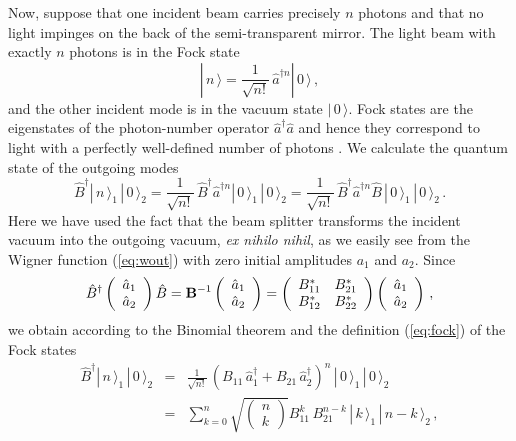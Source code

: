 \documentclass[12pt,amsmath,amssymb]{article}
\def\underline#1{{\bf #1}}
\numberwithin{equation}{section}
\begin{document}
Now, suppose that one incident beam carries precisely $n$ photons
and that no light impinges on the back of the semi-transparent
mirror. The light beam with exactly $n$ photons is in the Fock
state \cite{Leonhardt}
\begin{equation}
\label{eq:fock} |\,n\,\rangle =
\frac{1}{\sqrt{n!}}\,\hat{a}^{\dagger n} |\,0\,\rangle \,,
\end{equation}
and the other incident mode is in the vacuum state
$|\,0\,\rangle$. Fock states are the eigenstates of the
photon-number operator $\hat{a}^\dagger\hat{a}$ and hence they
correspond to light with a perfectly well-defined number of
photons \cite{Leonhardt}. We calculate the quantum state of the
outgoing modes
\begin{equation}
\hat{B}^\dagger |\,n\,\rangle_1\, |\,0\,\rangle_2 =
\frac{1}{\sqrt{n!}}\,\hat{B}^\dagger\hat{a}^{\dagger n}
|\,0\,\rangle_1\, |\,0\,\rangle_2 =
\frac{1}{\sqrt{n!}}\,\hat{B}^\dagger\hat{a}^{\dagger n}\hat{B}\,
|\,0\,\rangle_1\, |\,0\,\rangle_2 \,.
\end{equation}
Here we have used the fact that the beam splitter transforms the
incident vacuum into the outgoing vacuum, {\it ex nihilo nihil},
as we easily see from the Wigner function (\ref{eq:wout}) with
zero initial amplitudes $a_1$ and $a_2$. Since
\begin{equation}
\hat{B}^\dagger \left(
    \begin{array}{c}
     \hat{a}_1  \\
     \hat{a}_2
    \end{array}
\right) \hat{B} = \underline{B}^{-1} \left(
    \begin{array}{c}
     \hat{a}_1  \\
     \hat{a}_2
    \end{array}
\right) = \left(
    \begin{array}{cc}
      B_{11}^* & B_{21}^* \\
      B_{12}^* & B_{22}^*
    \end{array}
\right)\left(
    \begin{array}{c}
     \hat{a}_1  \\
     \hat{a}_2
    \end{array}
\right)\,,
\end{equation}
we obtain according to the Binomial theorem and the definition
(\ref{eq:fock}) of the Fock states
\begin{eqnarray}
\hat{B}^\dagger |\,n\,\rangle_1\, |\,0\,\rangle_2 &=&
\frac{1}{\sqrt{n!}}\,\left(B_{11}\,\hat{a}_1^\dagger +
B_{21}\,\hat{a}_2^\dagger\right)^n
\,|\,0\,\rangle_1\,|\,0\,\rangle_2 \nonumber\\
&=& \sum_{k=0}^n
\sqrt{
\left(\begin{array}{c}n\\k\end{array}\right)
}
B_{11}^k\,B_{21}^{n-k} \,|\,k\,\rangle_1\,|\,n-k\,\rangle_2 \,,
\label{eq:focksplit}
\end{eqnarray}
\end{document}
